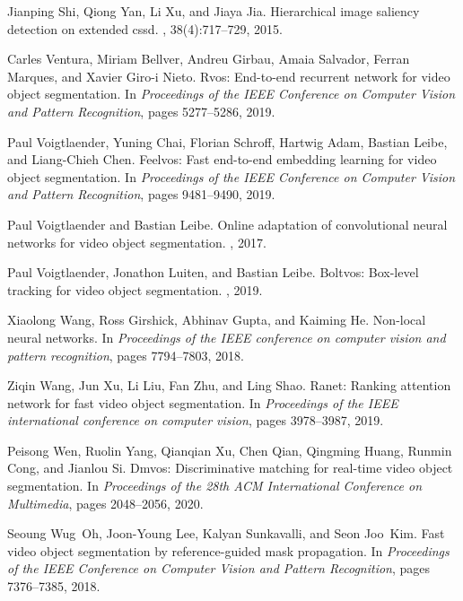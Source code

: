 \documentclass[final]{cvpr}
\begin{document}
{\begin{thebibliography}{10}
Jianping Shi, Qiong Yan, Li Xu, and Jiaya Jia.
\newblock Hierarchical image saliency detection on extended cssd.
,
  38(4):717--729, 2015.

Carles Ventura, Miriam Bellver, Andreu Girbau, Amaia Salvador, Ferran Marques,
  and Xavier Giro-i Nieto.
\newblock Rvos: End-to-end recurrent network for video object segmentation.
\newblock In {\em Proceedings of the IEEE Conference on Computer Vision and
  Pattern Recognition}, pages 5277--5286, 2019.

Paul Voigtlaender, Yuning Chai, Florian Schroff, Hartwig Adam, Bastian Leibe,
  and Liang-Chieh Chen.
\newblock Feelvos: Fast end-to-end embedding learning for video object
  segmentation.
\newblock In {\em Proceedings of the IEEE Conference on Computer Vision and
  Pattern Recognition}, pages 9481--9490, 2019.

Paul Voigtlaender and Bastian Leibe.
\newblock Online adaptation of convolutional neural networks for video object
  segmentation.
, 2017.

Paul Voigtlaender, Jonathon Luiten, and Bastian Leibe.
\newblock Boltvos: Box-level tracking for video object segmentation.
, 2019.

Xiaolong Wang, Ross Girshick, Abhinav Gupta, and Kaiming He.
\newblock Non-local neural networks.
\newblock In {\em Proceedings of the IEEE conference on computer vision and
  pattern recognition}, pages 7794--7803, 2018.

Ziqin Wang, Jun Xu, Li Liu, Fan Zhu, and Ling Shao.
\newblock Ranet: Ranking attention network for fast video object segmentation.
\newblock In {\em Proceedings of the IEEE international conference on computer
  vision}, pages 3978--3987, 2019.

Peisong Wen, Ruolin Yang, Qianqian Xu, Chen Qian, Qingming Huang, Runmin Cong,
  and Jianlou Si.
\newblock Dmvos: Discriminative matching for real-time video object
  segmentation.
\newblock In {\em Proceedings of the 28th ACM International Conference on
  Multimedia}, pages 2048--2056, 2020.

Seoung Wug~Oh, Joon-Young Lee, Kalyan Sunkavalli, and Seon Joo~Kim.
\newblock Fast video object segmentation by reference-guided mask propagation.
\newblock In {\em Proceedings of the IEEE Conference on Computer Vision and
  Pattern Recognition}, pages 7376--7385, 2018.


\end{thebibliography}}
\end{document}
